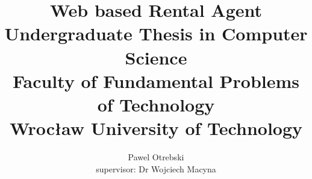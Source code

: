 \documentclass[10pt,a4paper]{report}
\begin{document}
\begin{titlepage}
\author{Pawel Otrebski \\
	\small{supervisor: Dr Wojciech Macyna}
 }
\title{Web based Rental Agent\\
	\small{
	Undergraduate Thesis in Computer Science\\
	Faculty of Fundamental Problems of Technology\\
	Wrocław University of Technology}}
\date{}
\end{titlepage}
\maketitle
\tableofcontents



\end{document}
